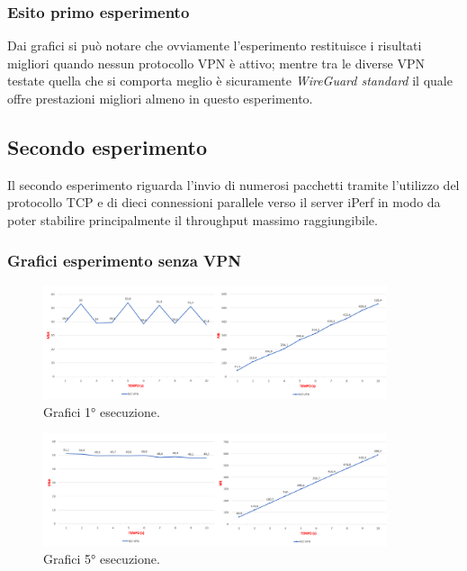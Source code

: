 \subsubsection{Esito primo esperimento}
Dai grafici si può notare che ovviamente l'esperimento restituisce i risultati migliori quando nessun protocollo VPN è attivo; mentre tra le diverse VPN testate quella che si comporta meglio è sicuramente \emph{WireGuard standard} il quale offre prestazioni migliori almeno in questo esperimento. 

\newpage
\subsection{Secondo esperimento}
Il secondo esperimento riguarda l'invio di numerosi pacchetti tramite l'utilizzo del protocollo TCP e di dieci connessioni parallele verso il server iPerf in modo da poter stabilire principalmente il throughput massimo raggiungibile.
\subsubsection{Grafici esperimento senza VPN}

\begin{figure}[h] \includegraphics[width=0.9\textwidth] {Tesi magistrale/capitoli/images/14.png}
\centering
\caption{Grafici 1° esecuzione.}
\end{figure}

\begin{figure}[h] \includegraphics[width=0.9\textwidth] {Tesi magistrale/capitoli/images/15.png}
\centering
\caption{Grafici 5° esecuzione.}
\end{figure}

